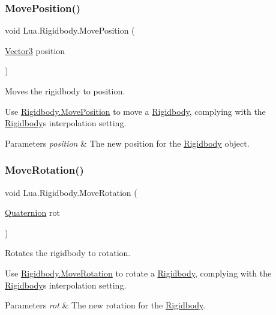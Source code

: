 \subsubsection{\texorpdfstring{MovePosition()}{MovePosition()}}
{\footnotesize\ttfamily void Lua.\+Rigidbody.\+Move\+Position (\begin{DoxyParamCaption}\item[{\mbox{\hyperlink{class_lua_1_1_vector3}{Vector3}}}]{position }\end{DoxyParamCaption})}



Moves the rigidbody to position. 

Use \mbox{\hyperlink{class_lua_1_1_rigidbody_a413146fdf9b4e57b433cbc01dc1bc288}{Rigidbody.\+Move\+Position}} to move a \mbox{\hyperlink{class_lua_1_1_rigidbody}{Rigidbody}}, complying with the \mbox{\hyperlink{class_lua_1_1_rigidbody}{Rigidbody}}\textquotesingle{}s interpolation setting. 
\begin{DoxyParams}{Parameters}
{\em position} & The new position for the \mbox{\hyperlink{class_lua_1_1_rigidbody}{Rigidbody}} object.\\
\hline
\end{DoxyParams}
\mbox{\label{class_lua_1_1_rigidbody_a064bd1441d0a8d7e636619c87a98f7cf}} 
\subsubsection{\texorpdfstring{MoveRotation()}{MoveRotation()}}
{\footnotesize\ttfamily void Lua.\+Rigidbody.\+Move\+Rotation (\begin{DoxyParamCaption}\item[{\mbox{\hyperlink{class_lua_1_1_quaternion}{Quaternion}}}]{rot }\end{DoxyParamCaption})}



Rotates the rigidbody to rotation. 

Use \mbox{\hyperlink{class_lua_1_1_rigidbody_a064bd1441d0a8d7e636619c87a98f7cf}{Rigidbody.\+Move\+Rotation}} to rotate a \mbox{\hyperlink{class_lua_1_1_rigidbody}{Rigidbody}}, complying with the \mbox{\hyperlink{class_lua_1_1_rigidbody}{Rigidbody}}\textquotesingle{}s interpolation setting. 
\begin{DoxyParams}{Parameters}
{\em rot} & The new rotation for the \mbox{\hyperlink{class_lua_1_1_rigidbody}{Rigidbody}}.\\
\hline
\end{DoxyParams}


